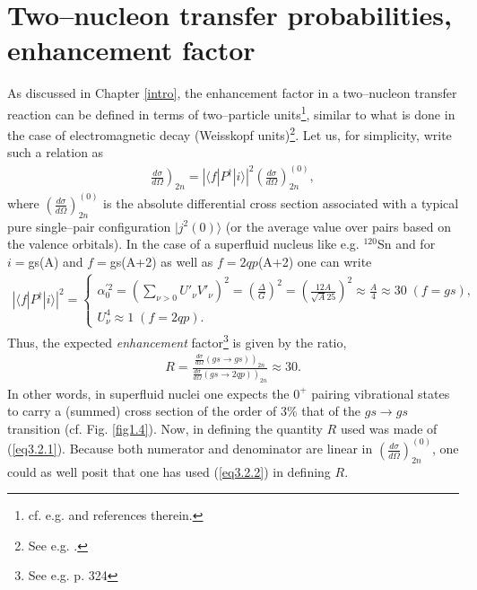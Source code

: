 \section[Transfer probabilities, enhancement factor]{Two--nucleon transfer probabilities, enhancement factor}\label{C3S2}
As discussed in Chapter \ref{intro}, the enhancement factor in a two--nucleon transfer reaction can be defined in terms of two--particle units\footnote{cf. e.g. \cite{Broglia:72b,Broglia:73} and references therein.}, similar to what is done in the case of electromagnetic decay (Weisskopf units)\footnote{See e.g. \cite{Bohr:69}.}. Let us, for simplicity, write such a relation as
\begin{align}\label{eq3.2.1}
\left.\frac{d\sigma}{d\Omega}\right)_{2n}=\left|\langle f|P^\dagger|i\rangle \right|^2\left(\frac{d\sigma}{d\Omega}\right)^{(0)}_{2n},
\end{align} 
where $\left(\frac{d\sigma}{d\Omega}\right)^{(0)}_{2n}$ is the absolute differential cross section associated with a typical pure single--pair configuration $|j^2(0)\rangle$ (or the average value over pairs based on the valence orbitals).  In the case of a superfluid nucleus like e.g. $^{120}$Sn and for $i=$gs(A) and $f=$gs(A+2) as well as $f=2qp$(A+2) one can write 
\begin{align}\label{eq3.2.2}
\left|\langle f|P^\dagger|i\rangle \right|^2=\left\{\begin{array}{l}
 \alpha_0^{'2}=\left(\sum_{\nu>0}U'_{\nu}V'_{\nu}\right)^2=\left(\frac{\Delta}{G}\right)^2=\left(\frac{12A}{\sqrt{A}25}\right)^2\approx\frac{A}{4}\approx 30\; (f=gs),\\
 U_\nu^4\approx 1\; (f=2qp).
\end{array} \right.
\end{align} 
Thus, the expected \textit{enhancement} factor\footnote{See e.g. \cite{Brink:05} p. 324} is given by the ratio, 
\begin{align}
R=\frac{\left.\frac{d\sigma}{d\Omega}(gs\rightarrow gs)\right)_{2n}}{\left.\frac{d\sigma}{d\Omega}(gs\rightarrow 2qp)\right)_{2n}}\approx 30.
\end{align}
In other words, in superfluid nuclei one expects the $0^+$ pairing vibrational states to carry a (summed) cross section of the order of 3\% that of the $gs\rightarrow gs$ transition (cf. Fig. \ref{fig1.4}).
Now, in defining the quantity $R$ used was made of (\ref{eq3.2.1}). Because both numerator and denominator are linear in $\left(\frac{d\sigma}{d\Omega}\right)_{2n}^{(0)}$, one could as well posit that one has used (\ref{eq3.2.2}) in defining $R$.


